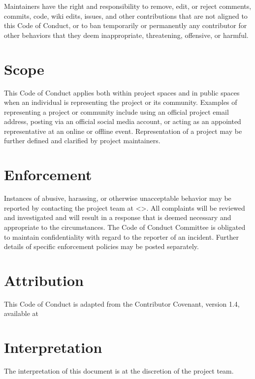 \documentclass[letterpaper,10pt,english]{sphinxmanual}
\begin{document}
\sphinxAtStartPar
Maintainers have the right and responsibility to remove, edit, or reject
comments, commits, code, wiki edits, issues, and other contributions that are
not aligned to this Code of Conduct, or to ban temporarily or permanently any
contributor for other behaviors that they deem inappropriate, threatening,
offensive, or harmful.


\section{Scope}
\label{\detokenize{Code-of-conduct:scope}}
\sphinxAtStartPar
This Code of Conduct applies both within project spaces and in public spaces
when an individual is representing the project or its community. Examples of
representing a project or community include using an official project e\sphinxhyphen{}mail
address, posting via an official social media account, or acting as an appointed
representative at an online or offline event. Representation of a project may be
further defined and clarified by project maintainers.


\section{Enforcement}
\label{\detokenize{Code-of-conduct:enforcement}}
\sphinxAtStartPar
Instances of abusive, harassing, or otherwise unacceptable behavior may be
reported by contacting the project team at \textless{}\textgreater{}.
All complaints will be reviewed and investigated
and will result in a response that is deemed necessary and appropriate
to the circumstances. The Code of Conduct Committee is obligated to
maintain confidentiality with regard to the reporter of an incident.
Further details of specific enforcement policies may be posted
separately.


\section{Attribution}
\label{\detokenize{Code-of-conduct:attribution}}
\sphinxAtStartPar
This Code of Conduct is adapted from the Contributor Covenant, version 1.4,
available at 


\section{Interpretation}
\label{\detokenize{Code-of-conduct:interpretation}}
\sphinxAtStartPar
The interpretation of this document is at the discretion of the project team.
\end{document}
